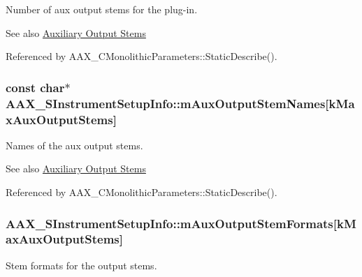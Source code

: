 Number of aux output stems for the plug-\/in. 

\begin{DoxySeeAlso}{See also}
\hyperlink{a00339}{Auxiliary Output Stems} 
\end{DoxySeeAlso}


Referenced by A\+A\+X\+\_\+\+C\+Monolithic\+Parameters\+::\+Static\+Describe().

\hypertarget{a00124_a407f17bca3271cc84f0b85eefb0370cd}{}
\subsubsection[{m\+Aux\+Output\+Stem\+Names}]{\setlength{\rightskip}{0pt plus 5cm}const char$\ast$ A\+A\+X\+\_\+\+S\+Instrument\+Setup\+Info\+::m\+Aux\+Output\+Stem\+Names\mbox{[}{\bf k\+Max\+Aux\+Output\+Stems}\mbox{]}}\label{a00124_a407f17bca3271cc84f0b85eefb0370cd}


Names of the aux output stems. 

\begin{DoxySeeAlso}{See also}
\hyperlink{a00339}{Auxiliary Output Stems} 
\end{DoxySeeAlso}


Referenced by A\+A\+X\+\_\+\+C\+Monolithic\+Parameters\+::\+Static\+Describe().

\hypertarget{a00124_afd521b6b1d9b3d809e55c5c065859159}{}
\subsubsection[{m\+Aux\+Output\+Stem\+Formats}]{ A\+A\+X\+\_\+\+S\+Instrument\+Setup\+Info\+::m\+Aux\+Output\+Stem\+Formats\mbox{[}{\bf k\+Max\+Aux\+Output\+Stems}\mbox{]}}\label{a00124_afd521b6b1d9b3d809e55c5c065859159}


Stem formats for the output stems. 

